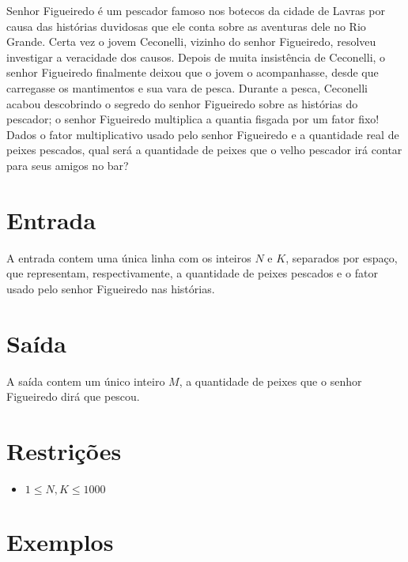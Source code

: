 Senhor Figueiredo é um pescador famoso nos botecos da cidade de Lavras por causa das histórias duvidosas que ele conta sobre as aventuras dele no Rio Grande.
Certa vez o jovem Ceconelli, vizinho do senhor Figueiredo, resolveu investigar a veracidade dos causos.
Depois de muita insistência de Ceconelli, o senhor Figueiredo finalmente deixou que o jovem o acompanhasse, desde que carregasse os mantimentos e sua vara de pesca.
Durante a pesca, Ceconelli acabou descobrindo o segredo do senhor Figueiredo sobre as histórias do pescador; o senhor Figueiredo multiplica a quantia fisgada por um fator fixo!
Dados o fator multiplicativo usado pelo senhor Figueiredo e a quantidade real de peixes pescados, qual será a quantidade de peixes que o velho pescador irá contar para seus amigos no bar?

\section*{Entrada}

A entrada contem uma única linha com os inteiros $N$ e $K$, separados por espaço, que representam, respectivamente, a quantidade de peixes pescados e o fator usado pelo senhor Figueiredo nas histórias.

\section*{Saída}

A saída contem um único inteiro $M$, a quantidade de peixes que o senhor Figueiredo dirá que pescou.

\section*{Restrições}

\begin{itemize}
\item $1 \leq N,K \leq 1000$
\end{itemize}


\section*{Exemplos}

\exemplo
